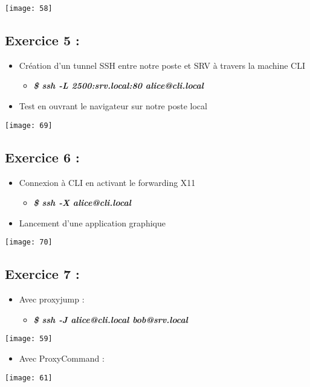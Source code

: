 \documentclass[a4paper]{article}
\begin{document}
	\texttt{[image: 58]}
	
	\subsection{Exercice 5 : }
	\begin{itemize}
		\item Création d’un tunnel SSH entre notre poste et SRV à travers la machine CLI
			\begin{itemize}
				\item \textbf{\textit{\$ ssh -L 2500:srv.local:80 alice@cli.local}}
			\end{itemize}
		\item Test en ouvrant le navigateur sur notre poste local 
	\end{itemize}
	
	\texttt{[image: 69]}
	
	\subsection{Exercice 6 :}
	\begin{itemize}
		\item Connexion à CLI en activant le forwarding X11
			\begin{itemize}
				\item \textbf{\textit{\$ ssh -X alice@cli.local}}
			\end{itemize}
		\item Lancement d'une application graphique
	\end{itemize}
	
	\texttt{[image: 70]}
	
	\subsection{Exercice 7 :}
	\begin{itemize}
		\item Avec proxyjump :
			\begin{itemize}
				\item \textbf{\textit{\$ ssh -J alice@cli.local bob@srv.local}}
			\end{itemize}
		
	\end{itemize}
	
	\texttt{[image: 59]}
	
	\begin{itemize}
		\item Avec ProxyCommand :
		
	\end{itemize}
	\texttt{[image: 61]}
	
\end{document}
